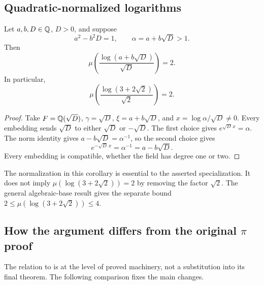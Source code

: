 \subsection{Quadratic-normalized logarithms}

\begin{corollary}\label{cor:quadratic}
Let \(a,b,D\in\mathbb Q\), \(D>0\), and suppose
\[
 a^2-b^2D=1,\qquad \alpha=a+b\sqrt D>1.
\]
Then
\[
 \mu\left(\frac{\log(a+b\sqrt D)}{\sqrt D}\right)=2.
\]
In particular,
\begin{equation}\label{eq:quadratic-example}
 \mu\left(\frac{\log(3+2\sqrt2)}{\sqrt2}\right)=2.
\end{equation}
\end{corollary}
\begin{proof}
Take \(F=\mathbb Q(\sqrt D)\), \(\gamma=\sqrt D\),
\(\xi=a+b\sqrt D\), and \(x=\log\alpha/\sqrt D\ne0\).
Every embedding sends \(\sqrt D\) to either \(\sqrt D\) or
\(-\sqrt D\). The first choice gives
\(e^{\sqrt D\,x}=\alpha\).
The norm identity gives \(a-b\sqrt D=\alpha^{-1}\), so the
second choice gives
\[
 e^{-\sqrt D\,x}=\alpha^{-1}=a-b\sqrt D.
\]
Every embedding is compatible, whether the field has degree one or two.
\end{proof}

The normalization in this corollary is essential to the asserted
specialization. It does not imply
\(\mu(\log(3+2\sqrt2))=2\) by removing the factor \(\sqrt2\).
The general algebraic-base result gives the separate bound
\(2\le\mu(\log(3+2\sqrt2))\le4\).

\subsection{How the argument differs from the original
\texorpdfstring{\(\pi\)}{pi} proof}

The relation to \cite{OAIpi} is at the level of proved machinery,
not a substitution into its final theorem.
The following comparison fixes the main changes.

